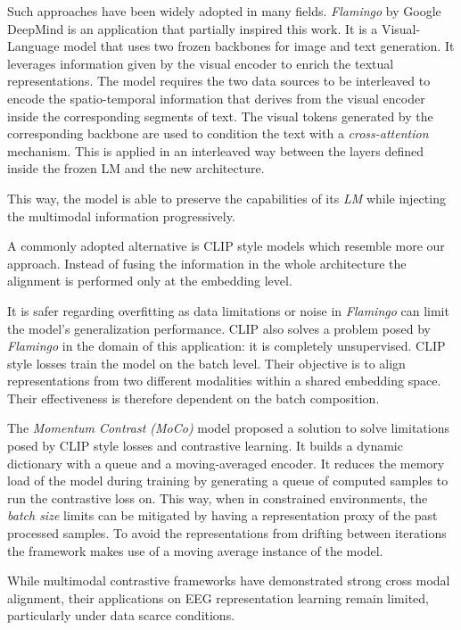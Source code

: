 Such approaches have been widely adopted in many fields.
\textit{Flamingo}\cite{alayrac2022flamingovisuallanguagemodel} by Google DeepMind is an application that partially inspired this work.
It is a Visual-Language model that uses two frozen backbones for image and text generation.
It leverages information given by the visual encoder to enrich the textual representations.
The model requires the two data sources to be interleaved to encode the spatio-temporal information that derives
from the visual encoder inside the corresponding segments of text.
The visual tokens generated by the corresponding backbone are used to condition the text with a \textit{cross-attention} mechanism\cite{vaswani2023attentionneed}.
This is applied in an interleaved way between the layers defined inside the frozen LM and the new architecture.

This way, the model is able to preserve the capabilities of its \textit{LM} while injecting the multimodal information progressively.

A commonly adopted alternative is CLIP\cite{radford2021learningtransferablevisualmodels} style models which resemble more our approach.
Instead of fusing the information in the whole architecture the alignment is performed only at the embedding level.

It is safer regarding overfitting as data limitations or noise in \textit{Flamingo} can limit the model's generalization performance.
CLIP also solves a problem posed by \textit{Flamingo} in the domain of this application: it is completely unsupervised.
CLIP style losses train the model on the batch level.
Their objective is to align representations from two different modalities within a shared embedding space.
Their effectiveness is therefore dependent on the batch composition.

The \textit{Momentum Contrast (MoCo)}\cite{he2020momentumcontrastunsupervisedvisual} model proposed a solution to solve limitations posed by CLIP style losses and contrastive learning.
It builds a dynamic dictionary with a queue and a moving-averaged encoder.
It reduces the memory load of the model during training by generating a queue of computed samples to run the contrastive loss on.
This way, when in constrained environments, the \textit{batch size} limits can be mitigated by having a representation proxy of the past processed samples.
To avoid the representations from drifting between iterations the framework makes use of a moving average instance of the model.

While multimodal contrastive frameworks have demonstrated strong cross modal alignment, their applications on EEG
representation learning remain limited, particularly under data scarce conditions.

